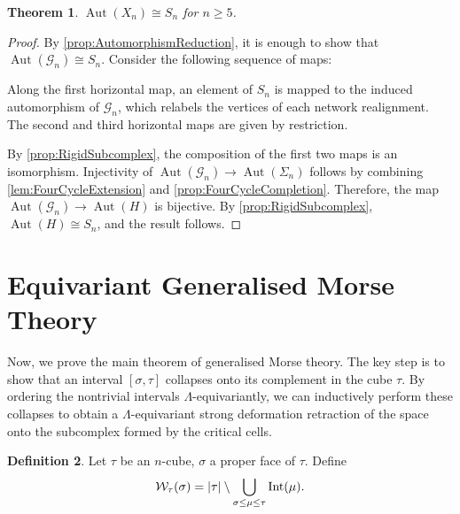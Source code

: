 \documentclass[reqno,dvipsnames]{amsart}
\newtheorem{theorem}{Theorem}[section]
\theoremstyle{plain}
\numberwithin{equation}{section}
\theoremstyle{definition}
\newtheorem{definition}[theorem]{Definition}
\DeclareMathOperator{\Aut}{Aut}
\begin{document}
		\begin{theorem}
			$\Aut(X_n) \cong S_n$ for $n\geq 5$.
		\end{theorem}

		\begin{proof}
			By \autoref{prop:AutomorphismReduction}, it is enough to show that $\Aut(\mathcal{G}_n) \cong S_n$. Consider the following sequence of maps:
			\begin{center}
			\end{center}
			Along the first horizontal map, an element of $S_n$ is mapped to the induced automorphism of $\mathcal{G}_n$, which relabels the vertices of each network realignment. The second and third horizontal maps are given by restriction. 
			
			By \autoref{prop:RigidSubcomplex}, the composition of the first two maps is an isomorphism. Injectivity of $\Aut(\mathcal{G}_n) \to \Aut(\Sigma_n)$ follows by combining \autoref{lem:FourCycleExtension} and \autoref{prop:FourCycleCompletion}. Therefore, the map $\Aut(\mathcal{G}_n) \to \Aut(H)$ is bijective. By \autoref{prop:RigidSubcomplex}, $\Aut (H) \cong S_n$, and the result follows.
		\end{proof}

    \newpage
	
		
	\newpage 

	\printbibliography
	
	
\newpage
\appendix
\section{Equivariant Generalised Morse Theory}\label{AppA}

Now, we prove the main theorem of generalised Morse theory. The key step is to show that an interval $[\sigma, \tau]$ collapses onto its complement in the cube $\tau$. By ordering the nontrivial intervals $\Lambda$-equivariantly, we can inductively perform these collapses to obtain a $\Lambda$-equivariant strong deformation retraction of the space onto the subcomplex formed by the critical cells.

\begin{definition}
	Let $\tau$ be an $n$-cube, $\sigma$ a proper face of $\tau$. Define 
	\begin{equation*}
		\mathcal{W}_{\tau}(\sigma) = \vert\tau\vert \setminus \bigcup\limits_{\sigma\leq\mu\leq\tau} 		\textup{Int}(\mu).
	\end{equation*}
\end{definition}
\end{document}
